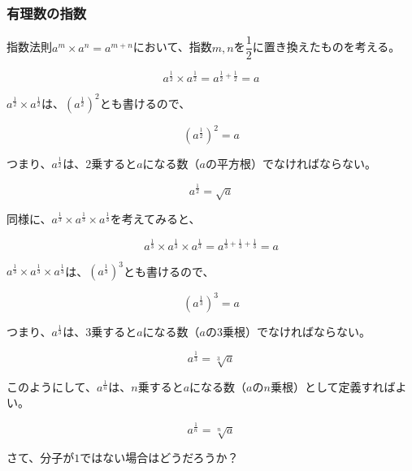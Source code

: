 \documentclass[16pt,b5paper]{book}
\begin{document}
\subsubsection{有理数の指数}

指数法則$a^m \times a^n = a^{m+n}$において、指数$m, n$を$\dfrac{1}{2}$に置き換えたものを考える。

\begin{equation}
  a^{\frac{1}{2}} \times a^{\frac{1}{2}} = a^{\frac{1}{2} + \frac{1}{2}} = a
\end{equation}

$a^{\frac{1}{2}} \times a^{\frac{1}{2}}$は、$(a^{\frac{1}{2}})^2$とも書けるので、

\begin{equation}
  (a^{\frac{1}{2}})^2 = a
\end{equation}

つまり、$a^{\frac{1}{2}}$は、2乗すると$a$になる数（$a$の平方根）でなければならない。

\begin{equation}
  a^{\frac{1}{2}} = \sqrt{a}
\end{equation}

同様に、$a^{\frac{1}{3}} \times a^{\frac{1}{3}} \times a^{\frac{1}{3}}$を考えてみると、

\begin{equation}
  a^{\frac{1}{3}} \times a^{\frac{1}{3}} \times a^{\frac{1}{3}} = a^{\frac{1}{3} + \frac{1}{3} + \frac{1}{3}} = a
\end{equation}

$a^{\frac{1}{3}} \times a^{\frac{1}{3}} \times a^{\frac{1}{3}}$は、$(a^{\frac{1}{3}})^3$とも書けるので、

\begin{equation}
  (a^{\frac{1}{3}})^3 = a
\end{equation}

つまり、$a^{\frac{1}{3}}$は、3乗すると$a$になる数（$a$の3乗根）でなければならない。

\begin{equation}
  a^{\frac{1}{3}} = \sqrt[3]{a}
\end{equation}

このようにして、$a^{\frac{1}{n}}$は、$n$乗すると$a$になる数（$a$の$n$乗根）として定義すればよい。

\begin{equation}
  a^{\frac{1}{n}} = \sqrt[n]{a}
\end{equation}

さて、分子が$1$ではない場合はどうだろうか？
\end{document}
